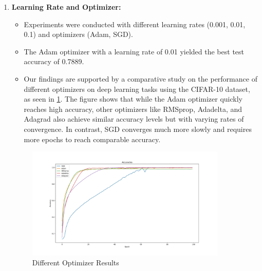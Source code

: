 \documentclass{article}
\begin{document}
\begin{enumerate}
    \item \textbf{Learning Rate and Optimizer:}
    \begin{itemize}
        \item Experiments were conducted with different learning rates (0.001, 0.01, 0.1) and optimizers (Adam, SGD).
        \item The Adam optimizer with a learning rate of 0.01 yielded the best test accuracy of 0.7889.
        \item Our findings are supported by a comparative study on the performance of different optimizers on deep learning tasks using the CIFAR-10 dataset, as seen in \ref{fig:optimizers}. The figure shows that while the Adam optimizer quickly reaches high accuracy, other optimizers like RMSprop, Adadelta, and Adagrad also achieve similar accuracy levels but with varying rates of convergence. In contrast, SGD converges much more slowly and requires more epochs to reach comparable accuracy.
    \end{itemize}

    \begin{figure}[H]
        \centering
        \includegraphics[width=0.9\textwidth]{optimizer-accuracies.jpg}
        \caption{Different Optimizer Results}
        \label{fig:optimizers}
    \end{figure}


\end{enumerate}
\end{document}
